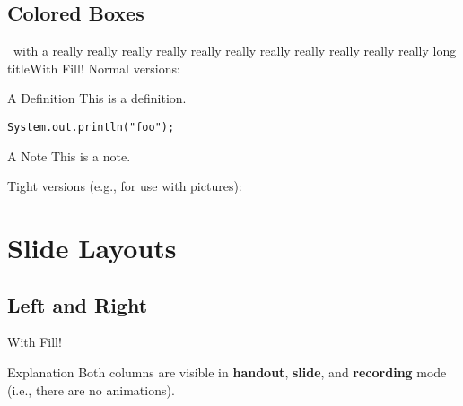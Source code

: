 \documentclass[
	aspectratio=169, %
	8pt, %
	english, %
]{beamer}
\begin{document}
\subsection{Colored Boxes}
\begin{frame}[fragile]{\insertsubsection\ with a really really really really really really really really really really really long title\hfill With Fill!}
	Normal versions:

\begin{leftmiddleandright}
		\begin{definition}{A Definition}
			This is a definition.
\begin{verbatim}
System.out.println("foo");
\end{verbatim}
		\end{definition}
\next
\next
		\begin{note}{A Note}
			This is a note.
		\end{note}
\end{leftmiddleandright}
	\vfill

	Tight versions (e.g., for use with pictures):

\end{frame}

\section{Slide Layouts}

\subsection{Left and Right}
\begin{frame}{\insertsubsection\hfill With Fill!}
	\vfill
	\begin{note}{Explanation}
		Both columns are visible in \textbf{handout}, \textbf{slide}, and \textbf{recording} mode (i.e., there are no animations).
	\end{note}
\end{frame}
\end{document}
